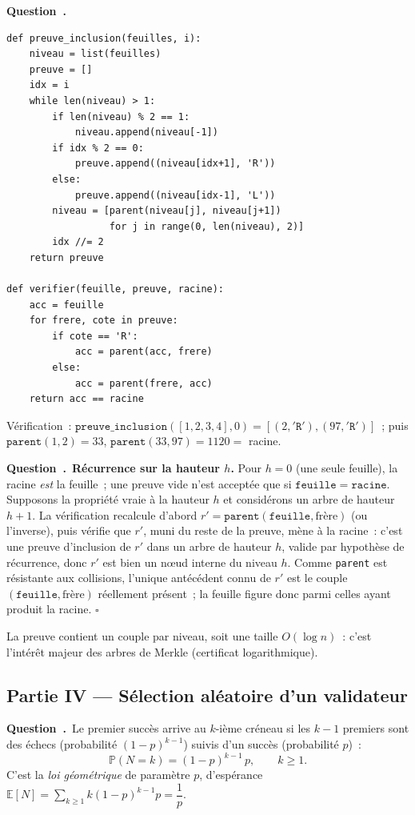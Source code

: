 \documentclass[11pt,a4paper]{article}
\newcounter{qcnt}
\newcommand{\Q}{\medskip\par\stepcounter{qcnt}\noindent\textbf{Question~\theqcnt.}~}
\newcommand{\code}[1]{\lstinline!#1!}
\begin{document}
\Q
\begin{lstlisting}
def preuve_inclusion(feuilles, i):
    niveau = list(feuilles)
    preuve = []
    idx = i
    while len(niveau) > 1:
        if len(niveau) % 2 == 1:
            niveau.append(niveau[-1])
        if idx % 2 == 0:
            preuve.append((niveau[idx+1], 'R'))
        else:
            preuve.append((niveau[idx-1], 'L'))
        niveau = [parent(niveau[j], niveau[j+1])
                  for j in range(0, len(niveau), 2)]
        idx //= 2
    return preuve

def verifier(feuille, preuve, racine):
    acc = feuille
    for frere, cote in preuve:
        if cote == 'R':
            acc = parent(acc, frere)
        else:
            acc = parent(frere, acc)
    return acc == racine
\end{lstlisting}
Vérification~: $\mathtt{preuve\_inclusion}([1,2,3,4],0) = [(2,\mathtt{'R'}),(97,\mathtt{'R'})]$~; puis
$\mathtt{parent}(1,2)=33$, $\mathtt{parent}(33,97)=1120=$ racine.

\Q \textbf{Récurrence sur la hauteur $h$.} Pour $h=0$ (une seule feuille), la racine \emph{est}
la feuille~; une preuve vide n'est acceptée que si $\mathtt{feuille} = \mathtt{racine}$. Supposons la
propriété vraie à la hauteur $h$ et considérons un arbre de hauteur $h+1$. La vérification
recalcule d'abord $r' = \mathtt{parent}(\mathtt{feuille}, \text{frère})$ (ou l'inverse), puis vérifie
que $r'$, muni du reste de la preuve, mène à la racine~: c'est une preuve d'inclusion de $r'$
dans un arbre de hauteur $h$, valide par hypothèse de récurrence, donc $r'$ est bien un n\oe ud
interne du niveau $h$. Comme \code{parent} est résistante aux collisions, l'unique antécédent
connu de $r'$ est le couple $(\mathtt{feuille}, \text{frère})$ réellement présent~; la feuille figure
donc parmi celles ayant produit la racine. $\square$

\noindent La preuve contient un couple par niveau, soit une taille $O(\log n)$~: c'est
l'intérêt majeur des arbres de Merkle (certificat logarithmique).

\subsection*{Partie IV --- Sélection aléatoire d'un validateur}

\Q Le premier succès arrive au $k$-ième créneau si les $k-1$ premiers sont des échecs
(probabilité $(1-p)^{k-1}$) suivis d'un succès (probabilité $p$)~:
$$\mathbb{P}(N = k) = (1-p)^{k-1}\,p, \qquad k \ge 1.$$
C'est la \emph{loi géométrique} de paramètre $p$, d'espérance
$\mathbb{E}[N] = \sum_{k\ge1} k (1-p)^{k-1} p = \dfrac{1}{p}.$
\end{document}
